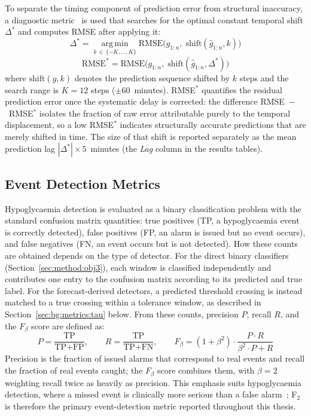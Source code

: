 To separate the timing component of prediction error from structural inaccuracy, a diagnostic metric~\citep{prg_glucose_proposal} is used that searches for the optimal constant temporal shift $\Delta^*$ and computes RMSE after applying it:
\begin{equation}
    \Delta^* = \operatorname*{arg\,min}_{k \,\in\, \{-K,\ldots,K\}} \text{RMSE}\bigl(g_{1:n},\; \text{shift}(\hat{g}_{1:n}, k)\bigr)
    \label{eq:best_lag}
\end{equation}
\begin{equation}
    \text{RMSE}^* = \text{RMSE}\bigl(g_{1:n},\; \text{shift}(\hat{g}_{1:n}, \Delta^*)\bigr)
    \label{eq:lag_rmse}
\end{equation}
where $\text{shift}(\hat{g}, k)$ denotes the prediction sequence shifted by $k$ steps and the search range is $K = 12$ steps ($\pm$60~minutes). RMSE$^*$ quantifies the residual prediction error once the systematic delay is corrected: the difference RMSE~$-$~RMSE$^*$ isolates the fraction of raw error attributable purely to the temporal displacement, so a low RMSE$^*$ indicates structurally accurate predictions that are merely shifted in time. The size of that shift is reported separately as the mean prediction lag $|\Delta^*| \times 5$~minutes (the \emph{Lag} column in the results tables).

\subsection{Event Detection Metrics} \label{sec:bg:metrics:event}

Hypoglycaemia detection is evaluated as a binary classification problem with the standard confusion matrix quantities: true positives (TP, a hypoglycaemia event is correctly detected), false positives (FP, an alarm is issued but no event occurs), and false negatives (FN, an event occurs but is not detected). How these counts are obtained depends on the type of detector. For the direct binary classifiers (Section~\ref{sec:method:obj3}), each window is classified independently and contributes one entry to the confusion matrix according to its predicted and true label. For the forecast-derived detectors, a predicted threshold crossing is instead matched to a true crossing within a tolerance window, as described in Section~\ref{sec:bg:metrics:tau} below. From these counts, precision $P$, recall $R$, and the $F_\beta$ score are defined as:
\begin{equation}
    P = \frac{\text{TP}}{\text{TP} + \text{FP}}, \qquad
    R = \frac{\text{TP}}{\text{TP} + \text{FN}}, \qquad
    F_\beta = (1 + \beta^2)\cdot\frac{P \cdot R}{\beta^2 \cdot P + R}
    \label{eq:f_score}
\end{equation}
Precision is the fraction of issued alarms that correspond to real events and recall the fraction of real events caught; the $F_\beta$ score combines them, with $\beta = 2$ weighting recall twice as heavily as precision. This emphasis suits hypoglycaemia detection, where a missed event is clinically more serious than a false alarm~\citep{battelino2019}; F$_2$ is therefore the primary event-detection metric reported throughout this thesis.

